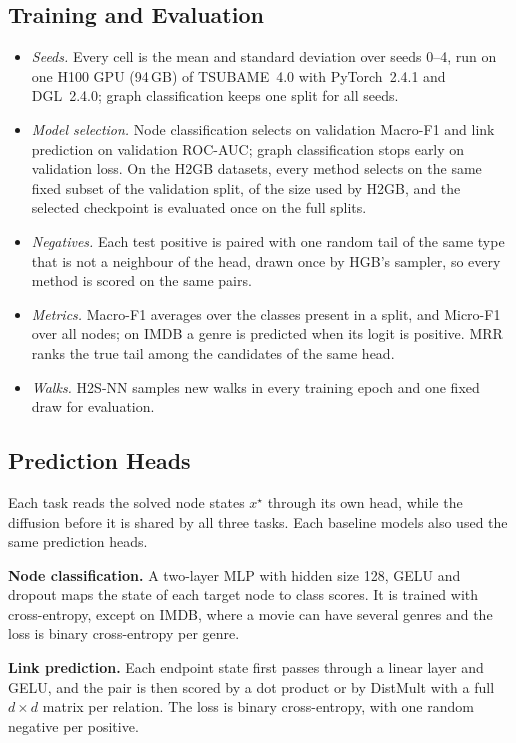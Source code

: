 \documentclass{article}
\newcommand{\method}{\textsc{H2S-NN}}
\begin{document}
\subsection{Training and Evaluation}
\begin{itemize}
  \item \emph{Seeds.} Every cell is the mean and standard deviation over seeds 0--4, run on one H100 GPU (94\,GB) of TSUBAME~4.0 with PyTorch~2.4.1 and DGL~2.4.0; graph classification keeps one split for all seeds.
  \item \emph{Model selection.} Node classification selects on validation Macro-F1 and link prediction on validation ROC-AUC; graph classification stops early on validation loss. On the H2GB datasets, every method selects on the same fixed subset of the validation split, of the size used by H2GB, and the selected checkpoint is evaluated once on the full splits.
  \item \emph{Negatives.} Each test positive is paired with one random tail of the same type that is not a neighbour of the head, drawn once by HGB's sampler, so every method is scored on the same pairs.
  \item \emph{Metrics.} Macro-F1 averages over the classes present in a split, and Micro-F1 over all nodes; on IMDB a genre is predicted when its logit is positive. MRR ranks the true tail among the candidates of the same head.
  \item \emph{Walks.} \method{} samples new walks in every training epoch and one fixed draw for evaluation.
\end{itemize}

\subsection{Prediction Heads}
Each task reads the solved node states $x^\star$ through its own head, while the diffusion before it is shared by all three tasks. Each baseline models also used the same prediction heads.

\textbf{Node classification.} A two-layer MLP with hidden size 128, GELU and dropout maps the state of each target node to class scores. It is trained with cross-entropy, except on IMDB, where a movie can have several genres and the loss is binary cross-entropy per genre.

\textbf{Link prediction.} Each endpoint state first passes through a linear layer and GELU, and the pair is then scored by a dot product or by DistMult with a full $d\times d$ matrix per relation. The loss is binary cross-entropy, with one random negative per positive.
\end{document}
